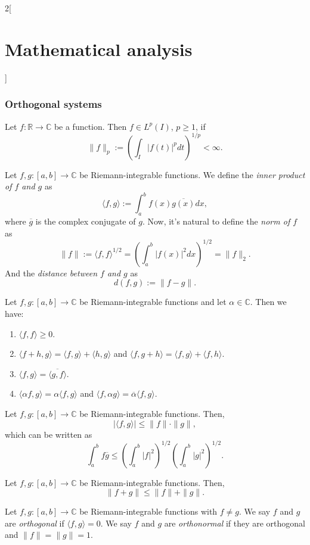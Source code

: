 \documentclass[../../../main.tex]{subfiles}
\begin{document}
\begin{multicols}{2}[\section{Mathematical analysis}]
\subsubsection*{Orthogonal systems}
\begin{definition}
Let $f:\mathbb{R}\rightarrow\mathbb{C}$ be a function. Then $f\in L^p(I)$, $p\geq1$, if $$\|f\|_p:=\left(\int_I|f(t)|^pdt\right)^{1/p}<\infty.$$ 
\end{definition}
\begin{definition}
Let $f,g:[a,b]\rightarrow\mathbb{C}$ be Riemann-integrable functions. We define the \textit{inner product of $f$ and $g$} as $$\langle f,g\rangle:=\int_a^bf(x)\overline{g(x)}dx,$$ where $\overline{g}$ is the complex conjugate of $g$. Now, it's natural to define the \textit{norm of $f$} as $$\|f\|:=\langle f,f\rangle^{1/2}=\left(\int_a^b|f(x)|^2dx\right)^{1/2}=\|f\|_2.$$ And the \textit{distance between $f$ and $g$} as $$d(f,g):=\|f-g\|.$$
\end{definition}
\begin{prop}
Let $f,g:[a,b]\rightarrow\mathbb{C}$ be Riemann-integrable functions and let $\alpha\in\mathbb{C}$. Then we have:
\begin{enumerate}
    \item $\langle f,f\rangle\geq 0$.
    \item $\langle f+h,g\rangle=\langle f,g\rangle+\langle h,g\rangle$ and $\langle f,g+h\rangle=\langle f,g\rangle+\langle f,h\rangle$.
    \item $\langle f,g\rangle=\overline{\langle g,f\rangle}$.
    \item $\langle \alpha f,g\rangle=\alpha\langle f,g\rangle$ and $\langle f,\alpha g\rangle=\overline{\alpha}\langle f,g\rangle$.
\end{enumerate}
\end{prop}
\begin{theorem}
Let $f,g:[a,b]\rightarrow\mathbb{C}$ be Riemann-integrable functions. Then, $$|\langle f,g\rangle|\leq\|f\|\cdot\|g\|,$$ which can be written as $$\int_a^bf\overline{g}\leq\left(\int_a^b|f|^2\right)^{1/2}\left(\int_a^b|g|^2\right)^{1/2}.$$
\end{theorem}
\begin{theorem}
Let $f,g:[a,b]\rightarrow\mathbb{C}$ be Riemann-integrable functions. Then, $$\| f+g\|\leq\|f\|+\|g\|.$$
\end{theorem}
\begin{definition}
Let $f,g:[a,b]\rightarrow\mathbb{C}$ be Riemann-integrable functions with $f\ne g$. We say $f$ and $g$ are \textit{orthogonal} if $\langle f,g\rangle=0$. We say $f$ and $g$ are \textit{orthonormal} if they are orthogonal and $\|f\|=\|g\|=1$.

\end{definition}
\end{multicols}
\end{document}
